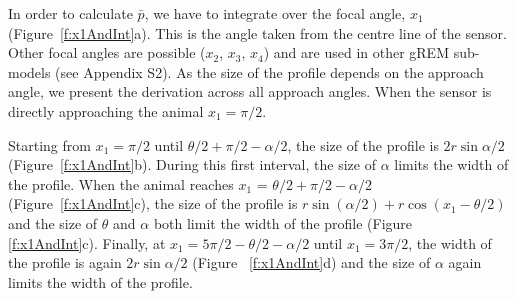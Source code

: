 In order to calculate $\bar{p}$, we have to integrate over the focal angle, $x_1$ (Figure~\ref{f:x1AndInt}a).
This is the angle taken from the centre line of the sensor.
Other focal angles are possible ($x_2$, $x_3$, $x_4$) and are used in other gREM sub-models (see Appendix S2).
As the size of the profile depends on the approach angle, we present the derivation across all approach angles.
When the sensor is directly approaching the animal $x_1  = \pi/2$.

Starting from $x_1 = \pi/2$ until $\theta/2 + \pi/2 - \alpha/2$, the size of the profile is $2r\sin \alpha/2$ (Figure~\ref{f:x1AndInt}b).
During this first interval, the size of $\alpha$ limits the width of the profile.
When the animal reaches $x_1$  = $\theta/2 + \pi/2 - \alpha/2$ (Figure~\ref{f:x1AndInt}c), the size of the profile is $r\sin( \alpha/2) + r\cos( x_1  - \theta/2)$ and the size of $\theta$ and $\alpha$ both limit the width of the profile (Figure~ \ref{f:x1AndInt}c).
Finally, at $x_1  = 5\pi/2 - \theta/2  - \alpha/2$ until $x_1  = 3\pi/2$, the width of the profile is again $2r\sin\alpha/2$ (Figure~ \ref{f:x1AndInt}d) and the size of $\alpha$ again limits the width of the profile. 


